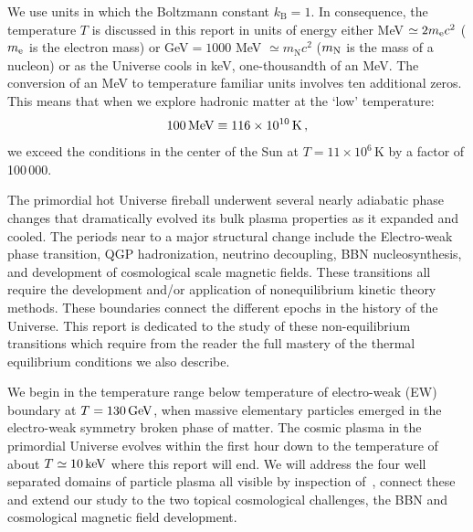 We use units in which the Boltzmann constant $k_\mathrm{B}=1$. In consequence, the temperature $T$ is discussed in this report in units of energy either MeV $\simeq 2 m_{\rm e} c^2$ ($m_{\rm e}$ is the electron mass) or GeV$= 1000$ MeV $\simeq m_{\mathrm N} c^2$ ($m_{\rm N}$ is the mass of a nucleon) or as the Universe cools in keV, one-thousandth of an MeV. The conversion of an MeV to temperature familiar units involves ten additional zeros. This means that when we explore hadronic matter at the `low' temperature: 
\begin{equation} \label{tempval}
100\text{\,MeV}\equiv 116\times 10^{10}\,\mathrm{K}\, ,
\end{equation}
we exceed the conditions in the center of the Sun at $T=11\times 10^6$\,K by a factor of 100\,000. 

 
The primordial hot Universe fireball underwent several nearly adiabatic phase changes that dramatically evolved its bulk plasma properties as it expanded and cooled. {\color{black} The periods near to a major structural change include the Electro-weak phase transition, QGP hadronization, neutrino decoupling, BBN nucleosynthesis, and development of cosmological scale magnetic fields. These transitions all require the development and/or application of nonequilibrium kinetic theory methods. These boundaries connect the different epochs in the history of the Universe. This report is dedicated to the study of these non-equilibrium transitions which require from the reader the full mastery of the thermal equilibrium conditions we also describe.}

We begin in the temperature range below temperature of electro-weak (EW) boundary at $T=130\text{\,GeV}$, when massive elementary particles emerged in the electro-weak symmetry broken phase of matter. {\color{black}The cosmic plasma in the primordial Universe evolves within the first hour down to the temperature of about $T\simeq 10\text{\,keV}$ where this report will end. We will address the four well separated domains of particle plasma all visible by inspection of~, connect these and extend our study to the two topical cosmological challenges, the BBN and cosmological magnetic field development.}

